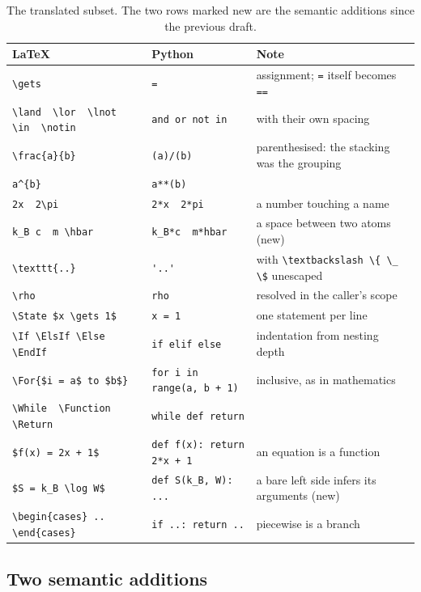 \documentclass[11pt]{article}
\begin{document}
\begin{table}[h]
\centering\footnotesize
\begin{tabular}{@{}lll@{}}
\toprule
\LaTeX{} & Python & Note \\
\midrule
\verb|\gets| & \verb|=| & assignment; \verb|=| itself becomes \verb|==| \\
\verb|\land  \lor  \lnot  \in  \notin| & \verb|and or not in| & with their own spacing \\
\verb|\frac{a}{b}| & \verb|(a)/(b)| & parenthesised: the stacking was the grouping \\
\verb|a^{b}| & \verb|a**(b)| & \\
\verb|2x  2\pi| & \verb|2*x  2*pi| & a number touching a name \\
\verb|k_B c  m \hbar| & \verb|k_B*c  m*hbar| & a space between two atoms (new) \\
\verb|\texttt{..}| & \verb|'..'| & with \verb|\textbackslash \{ \_ \$| unescaped \\
\verb|\rho| & \verb|rho| & resolved in the caller's scope \\
\verb|\State $x \gets 1$| & \verb|x = 1| & one statement per line \\
\verb|\If \ElsIf \Else \EndIf| & \verb|if elif else| & indentation from nesting depth \\
\verb|\For{$i = a$ to $b$}| & \verb|for i in range(a, b + 1)| & inclusive, as in mathematics \\
\verb|\While  \Function  \Return| & \verb|while def return| & \\
\verb|$f(x) = 2x + 1$| & \verb|def f(x): return 2*x + 1| & an equation is a function \\
\verb|$S = k_B \log W$| & \verb|def S(k_B, W): ...| & a bare left side infers its arguments (new) \\
\verb|\begin{cases} .. \end{cases}| & \verb|if ..: return ..| & piecewise is a branch \\
\bottomrule
\end{tabular}
\caption{The translated subset. The two rows marked new are the semantic
additions since the previous draft.}
\label{tab:subset}
\end{table}

\subsection{Two semantic additions}
\end{document}
